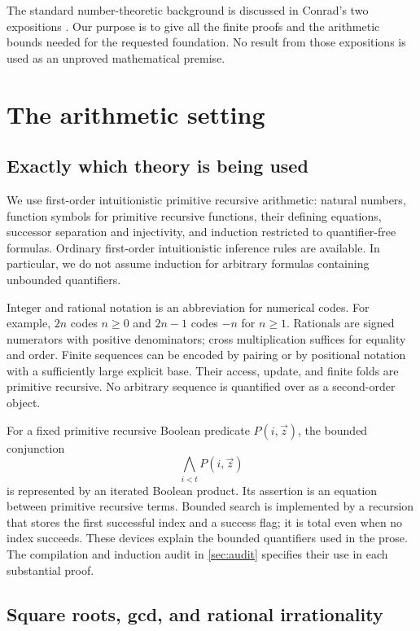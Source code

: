 \documentclass[11pt,letterpaper]{article}
\theoremstyle{definition}
\begin{document}
The standard number-theoretic background is discussed in Conrad's two
expositions \cite{conrad1,conrad2}. Our purpose is to give all the finite
proofs and the arithmetic bounds needed for the requested foundation. No
result from those expositions is used as an unproved mathematical premise.

\section{The arithmetic setting}\label{sec:arithmetic}

\subsection{Exactly which theory is being used}

We use first-order intuitionistic primitive recursive arithmetic: natural
numbers, function symbols for primitive recursive functions, their defining
equations, successor separation and injectivity, and induction restricted to
quantifier-free formulas. Ordinary first-order intuitionistic inference rules
are available. In particular, we do not assume induction for arbitrary
formulas containing unbounded quantifiers.

Integer and rational notation is an abbreviation for numerical codes.
For example, $2n$ codes $n\ge0$ and $2n-1$ codes $-n$ for $n\ge1$.
Rationals are signed numerators with positive denominators; cross
multiplication suffices for equality and order. Finite sequences can be
encoded by pairing or by positional notation with a sufficiently large
explicit base. Their access, update, and finite folds are primitive recursive.
No arbitrary sequence is quantified over as a second-order object.

For a fixed primitive recursive Boolean predicate $P(i,\vec z)$, the bounded
conjunction
\[
 \bigwedge_{i<t}P(i,\vec z)
\]
is represented by an iterated Boolean product. Its assertion is an equation
between primitive recursive terms. Bounded search is implemented by a
recursion that stores the first successful index and a success flag; it is
total even when no index succeeds. These devices explain the bounded
quantifiers used in the prose. The compilation and induction audit in
\cref{sec:audit} specifies their use in each substantial proof.

\subsection{Square roots, gcd, and rational irrationality}
\end{document}
